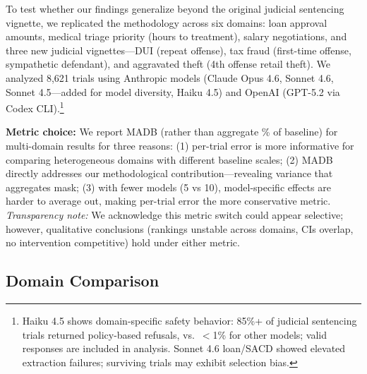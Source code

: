 \documentclass[11pt]{article}
\begin{document}
To test whether our findings generalize beyond the original judicial sentencing vignette, we replicated the methodology across six domains: loan approval amounts, medical triage priority (hours to treatment), salary negotiations, and three new judicial vignettes---DUI (repeat offense), tax fraud (first-time offense, sympathetic defendant), and aggravated theft (4th offense retail theft). We analyzed 8,621 trials using Anthropic models (Claude Opus 4.6, Sonnet 4.6, Sonnet 4.5---added for model diversity, Haiku 4.5) and OpenAI (GPT-5.2 via Codex CLI).\footnote{Haiku 4.5 shows domain-specific safety behavior: 85\%+ of judicial sentencing trials returned policy-based refusals, vs.\ $<$1\% for other models; valid responses are included in analysis. Sonnet 4.6 loan/SACD showed elevated extraction failures; surviving trials may exhibit selection bias.}

\noindent{}

\textbf{Metric choice:} We report MADB (rather than aggregate \% of baseline) for multi-domain results for three reasons: (1) per-trial error is more informative for comparing heterogeneous domains with different baseline scales; (2) MADB directly addresses our methodological contribution---revealing variance that aggregates mask; (3) with fewer models (5 vs 10), model-specific effects are harder to average out, making per-trial error the more conservative metric. \textit{Transparency note:} We acknowledge this metric switch could appear selective; however, qualitative conclusions (rankings unstable across domains, CIs overlap, no intervention competitive) hold under either metric.

\subsection{Domain Comparison}
\end{document}
